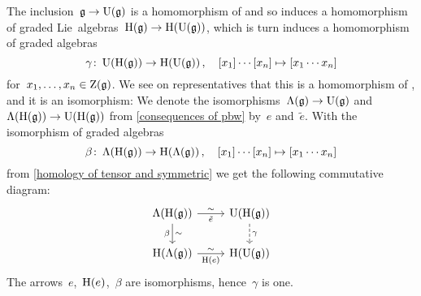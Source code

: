 \documentclass[a4paper,10pt,headings=standardclasses]{scrartcl}
\begin{document}
\begin{example}
  The inclusion~$\mathfrak{g} \to \operatorname{U}(\mathfrak{g})$ is a homomorphism of {\dgl} and so induces a homomorphism of graded Lie~algebras~$\operatorname{H}(\mathfrak{g}) \to \operatorname{H}(\operatorname{U}(\mathfrak{g}))$, which is turn induces a homomorphism of graded algebras
  \[
    \gamma
    \colon
    \operatorname{U}(\operatorname{H}(\mathfrak{g}))
    \to
    \operatorname{H}(\operatorname{U}(\mathfrak{g})) \,,
    \quad
    [x_1] \dotsm [x_n]
    \mapsto
    [x_1 \dotsm x_n]
  \]
  for~$x_1, \dotsc, x_n \in \operatorname{Z}(\mathfrak{g})$.
  We see on representatives that this is a homomorphism of {\dghs}, and it is an isomorphism:  
  We denote the isomorphisms~$\operatorname{\Lambda}(\mathfrak{g}) \to \operatorname{U}(\mathfrak{g})$ and~$\operatorname{\Lambda}(\operatorname{H}(\mathfrak{g})) \to \operatorname{U}(\operatorname{H}(\mathfrak{g}))$ from \cref{consequences of pbw} by~$e$ and~$\tilde{e}$.
  With the isomorphism of graded algebras
  \[
    \beta
    \colon
    \operatorname{\Lambda}(\operatorname{H}(\mathfrak{g}))
    \to
    \operatorname{H}(\operatorname{\Lambda}(\mathfrak{g})) \,,
    \quad
    [x_1] \dotsm [x_n]
    \mapsto
    [x_1 \dotsm x_n]
  \]
  from \cref{homology of tensor and symmetric} we get the following commutative diagram:
  \[
    \begin{tikzcd}
      \dgSymm(\homology(\glie))
      \arrow{r}[below]{\tilde{e}}[above]{\sim}
      \arrow{d}[left]{\beta}[right]{\sim}
      &
      \Univ(\homology(\glie))
      \arrow[dashed]{d}[right]{\gamma}
      \\
      \homology(\dgSymm(\glie))
      \arrow{r}[below]{\homology(e)}[above]{\sim}
      &
      \homology(\Univ(\glie))
    \end{tikzcd}
  \]
  The arrows~$e$,~$\operatorname{H}(e)$,~$\beta$ are isomorphisms, hence~$\gamma$ is one.
\end{example}
\end{document}
